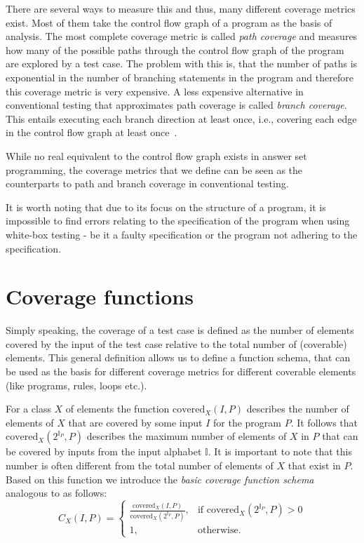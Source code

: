 There are several ways to measure this and thus, many different coverage metrics exist. Most of them take the control flow graph of a program as the basis of analysis. The most complete coverage metric is called \emph{path coverage} and measures how many of the possible paths through the control flow graph of the program are explored by a test case. The problem with this is, that the number of paths is exponential in the number of branching statements in the program and therefore this coverage metric is very expensive. A less expensive alternative in conventional testing that approximates path coverage is called \emph{branch coverage}. This entails executing each branch direction at least once, i.e., covering each edge in the control flow graph at least once~\cite[41\psqq]{MB12}.

While no real equivalent to the control flow graph exists in answer set programming, the coverage metrics that we define can be seen as the counterparts to path and branch coverage in conventional testing.

It is worth noting that due to its focus on the structure of a program, it is impossible to find errors relating to the specification of the program when using white-box testing - be it a faulty specification or the program not adhering to the specification.


\section{Coverage functions}
\label{sec:Coverage metrics/Coverage functions}
Simply speaking, the coverage of a test case is defined as the number of elements covered by the input of the test case relative to the total number of (coverable) elements. This general definition allows us to define a function schema, that can be used as the basis for different coverage metrics for different coverable elements (like programs, rules, loops etc.). 

For a class $X$ of elements the function \(\text{covered}_X(I, P)\) describes the number of elements of $X$ that are covered by some input $I$ for the program $P$. It follows that \(\text{covered}_X(2^{\mathbb{I}_P}, P)\) describes the maximum number of elements of $X$ in $P$ that can be covered by inputs from the input alphabet \(\mathbb{I}\). It is important to note that this number is often different from the total number of elements of $X$ that exist in $P$. Based on this function we introduce the \emph{basic coverage function schema} analogous to  \textcite{Jan+10} as follows:
\begin{equation}
\label{eq:coverage function schema}
    C_X(I, P) = 
    \begin{cases}
        \frac{\text{covered}_X(I, P)}{\text{covered}_X(2^{\mathbb{I}_P}, P)}, & \text{if covered}_X(2^{\mathbb{I}_P}, P) > 0 \\
        1, & \text{otherwise.}
    \end{cases}
\end{equation}

